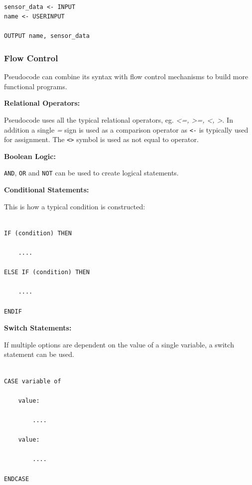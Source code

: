 \documentclass[9pt]{article}
\begin{document}
\begin{verbatim}

sensor_data <- INPUT
name <- USERINPUT

OUTPUT name, sensor_data

\end{verbatim}

\subsubsection{Flow Control}
\label{sec:org1c68623}

Pseudocode can combine its syntax with flow control mechanisms to build more functional programs.

\textbf{Relational Operators:}

Pseudocode uses all the typical relational operators, eg. \emph{<=, >=, <, >}. In addition a single \emph{=} sign is used as a comparison operator as \texttt{<-} is typically used for assignment. The \texttt{<>} symbol is used as not equal to operator.

\textbf{Boolean Logic:}

\texttt{AND}, \texttt{OR} and \texttt{NOT} can be used to create logical statements.

\textbf{Conditional Statements:}

This is how a typical condition is constructed:

\begin{verbatim}

IF (condition) THEN

    ....

ELSE IF (condition) THEN

    ....

ENDIF

\end{verbatim}

\textbf{Switch Statements:}

If multiple options are dependent on the value of a single variable, a switch statement can be used.

\begin{verbatim}

CASE variable of

    value:

        ....

    value:

        ....

ENDCASE

\end{verbatim}
\end{document}
